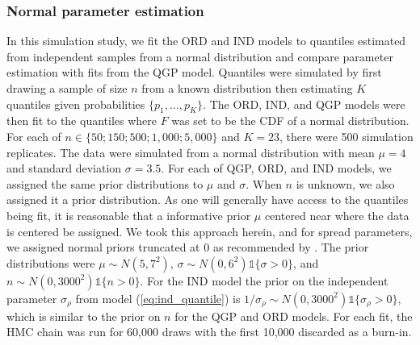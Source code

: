 \documentclass[preprint,12pt,authoryear]{elsarticle}
\newcommand{\1}[1]{\mathds{1}\left[#1\right]}
\begin{document}
\subsubsection{Normal parameter estimation}
In this simulation study, we fit the ORD and IND models to quantiles estimated 
from independent samples from a normal distribution and compare parameter 
estimation with fits from the QGP model. Quantiles were simulated by first 
drawing a sample of size $n$ from a known distribution then estimating $K$ 
quantiles given probabilities $\{p_1, ..., p_K\}$. The ORD, IND, and QGP models 
were then fit to the quantiles where $F$ was set to be the CDF of a normal 
distribution. For each of 
$n \in \{50; 150; 500; 1{,}000; 5{,}000\}$ and 
$K = 23$, there 
were 500 simulation replicates. The data were simulated from a normal 
distribution with mean $\mu = 4$ and standard deviation $\sigma = 3.5$.
For each of QGP, ORD, and IND models, we assigned the same prior distributions 
to $\mu$ and $\sigma$. When $n$ is unknown, we also assigned it a prior 
distribution. 
As one will generally have access to the quantiles being fit, 
it is reasonable that a informative prior $\mu$ centered near where the data is
centered be assigned. We took this approach herein, and for spread parameters,
we assigned normal priors truncated at 0 as recommended by
\cite{gelman2006prior}.
The prior distributions were $\mu \sim N(5,7^2)$,
$\sigma \sim N(0, 6^2) \mathds{1} \{\sigma > 0\}$, and
$n \sim N(0,3000^2)\mathds{1}\{n > 0\}$.
For the IND model the prior on the independent parameter 
$\sigma_{\rho}$ from model (\ref{eq:ind_quantile}) is 
$1/\sigma_{\rho} \sim N(0, 3000^2)\mathds{1}\{\sigma_{\rho} > 0\}$,
which is similar to the prior on $n$ for 
the QGP and ORD models. For each fit, the HMC chain was run for 60,000 draws 
with the first 10,000 discarded as a burn-in.
\end{document}

